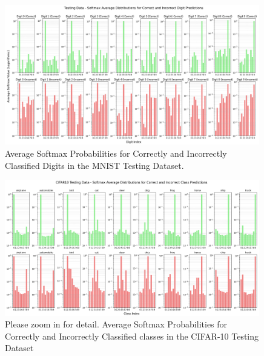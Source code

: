 \begin{figure}[ht]
    \centering
    \includegraphics[width=0.99\textwidth]{Figures/MNIST_Softmax_Averages_Testing.png}
    \caption{Average Softmax Probabilities for Correctly and Incorrectly Classified Digits in the MNIST Testing Dataset.}
    \label{fig:MNIST_Softmax_Averages_Testing}
\end{figure}


\begin{figure}[ht]
    \centering
    \includegraphics[width=0.99\textwidth]{Figures/CIFAR10_testing_plot_centroid_distance_bars.png}
    \caption{Please zoom in for detail. Average Softmax Probabilities for Correctly and Incorrectly Classified classes in the CIFAR-10 Testing Dataset}
    \label{fig:CIFAR10_testing_plot_centroid_distance_bars.png}
\end{figure}


